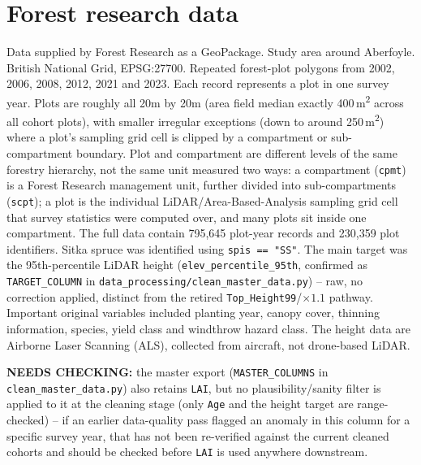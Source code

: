 \section{Forest research data}
Data supplied by Forest Research as a GeoPackage.
Study area around Aberfoyle.
British National Grid, EPSG:27700.
Repeated forest-plot polygons from 2002, 2006, 2008, 2012, 2021 and 2023.
Each record represents a plot in one survey year.
Plots are roughly all 20m by 20m (area field median exactly 400\,m\textsuperscript{2} across all cohort plots), with smaller irregular exceptions (down to around 250\,m\textsuperscript{2}) where a plot's sampling grid cell is clipped by a compartment or sub-compartment boundary.
Plot and compartment are different levels of the same forestry hierarchy, not the same unit measured two ways: a compartment (\texttt{cpmt}) is a Forest Research management unit, further divided into sub-compartments (\texttt{scpt}); a plot is the individual LiDAR/Area-Based-Analysis sampling grid cell that survey statistics were computed over, 
and many plots sit inside one compartment.
The full data contain 795,645 plot-year records and 230,359 plot identifiers.
Sitka spruce was identified using \texttt{spis == "SS"}.
The main target was the 95th-percentile LiDAR height (\texttt{elev\_percentile\_95th}, confirmed as \texttt{TARGET\_COLUMN} in \texttt{data\_processing/clean\_master\_data.py}) -- raw, no correction applied, distinct from the retired \texttt{Top\_Height99}/$\times1.1$ pathway.
Important original variables included planting year, canopy cover, thinning information, species, yield class and windthrow hazard class.
The height data are Airborne Laser Scanning (ALS), collected from aircraft, not drone-based LiDAR.

\textbf{NEEDS CHECKING:} the master export (\texttt{MASTER\_COLUMNS} in \texttt{clean\_master\_data.py}) also retains \texttt{LAI}, but no plausibility/sanity filter is applied to it at the cleaning stage (only \texttt{Age} and the height target are range-checked) -- if an earlier data-quality pass flagged an anomaly in this column for a specific survey year, that has not been re-verified against the current cleaned cohorts and should be checked before \texttt{LAI} is used anywhere downstream.

